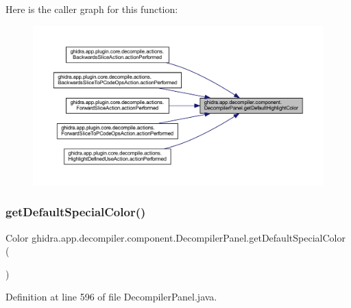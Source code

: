 Here is the caller graph for this function\+:
\nopagebreak
\begin{figure}[H]
\begin{center}
\leavevmode
\includegraphics[width=350pt]{classghidra_1_1app_1_1decompiler_1_1component_1_1_decompiler_panel_a31b55910dd10b4b190eb729fcea60eb3_icgraph}
\end{center}
\end{figure}
\mbox{\label{classghidra_1_1app_1_1decompiler_1_1component_1_1_decompiler_panel_a28efeaf147c13c36846a05030f8e2532}} 
\subsubsection{\texorpdfstring{getDefaultSpecialColor()}{getDefaultSpecialColor()}}
{\footnotesize\ttfamily Color ghidra.\+app.\+decompiler.\+component.\+Decompiler\+Panel.\+get\+Default\+Special\+Color (\begin{DoxyParamCaption}{ }\end{DoxyParamCaption})\hspace{0.3cm}{\ttfamily [inline]}}



Definition at line 596 of file Decompiler\+Panel.\+java.

